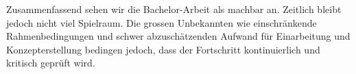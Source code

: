 \noindent
Zusammenfassend sehen wir die Bachelor-Arbeit als machbar an. Zeitlich bleibt jedoch nicht viel Spielraum. Die grossen Unbekannten wie  einschränkende Rahmenbedingungen und schwer abzuschätzenden Aufwand für Einarbeitung und Konzepterstellung bedingen jedoch, dass der Fortschritt kontinuierlich und kritisch geprüft wird.